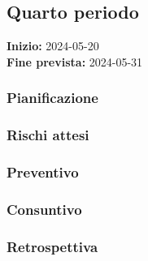 \subsection{Quarto periodo} \label{sec:4_rtb}
\textbf{Inizio:} 2024-05-20\\
\textbf{Fine prevista:} 2024-05-31
\subsubsection{Pianificazione}
\subsubsection{Rischi attesi}
\subsubsection{Preventivo}
\subsubsection{Consuntivo}
\subsubsection{Retrospettiva}
